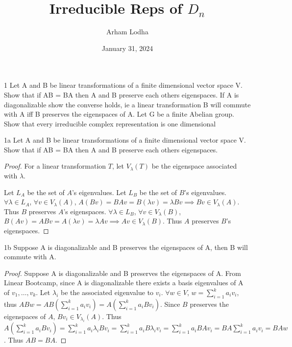 \documentclass{article}
\begin{document}
\title{Irreducible Reps of $D_n$}
\author{Arham Lodha}%
\date{January 31, 2024}%
\maketitle

\begin{PROB}{1}\label{Problem 1.}
    Let A and B be linear transformations of a finite dimensional vector space V. Show that if AB = BA then A and B preserve each others eigenspaces. If A is diagonalizable show the converse holds, ie a linear transformation B will commute with A iff B preserves the eigenspaces of A. Let G be a finite Abelian group. Show that every irreducible complex representation is one dimensional
\end{PROB}
\begin{claim}{1a}\label{Claim 1a.}
    Let A and B be linear transformations of a finite dimensional vector space V. Show that if AB = BA then A and B preserve each others eigenspaces.
\end{claim}
\begin{proof}
    For a linear transformation $T$, let $V_\lambda(T)$ be the eigenspace associated with $\lambda$.   

    Let $L_A$ be the set of $A$'s eigenvalues. Let $L_B$ be the set of $B$'s eigenvalues. $\forall \lambda \in L_A$, $\forall v \in V_\lambda(A)$, $A(Bv) = BAv = B \left(\lambda v\right) = \lambda Bv \implies Bv \in V_\lambda(A)$. Thus $B$ preserves $A$'s eigenspaces. $\forall \lambda \in L_B$, $\forall v \in V_\lambda(B)$, $B(Av) = ABv = A \left(\lambda v\right) = \lambda Av \implies Av \in V_\lambda(B)$. Thus $A$ preserves $B$'s eigenspaces.
\end{proof}
\begin{claim}{1b}\label{Claim 1b.}
    Suppose A is diagonalizable and B preserves the eigenspaces of A, then B will commute with A.
\end{claim}
\begin{proof}
    Suppose A is diagonalizable and B preserves the eigenspaces of A. From Linear Bootcamp, since A is diagonalizable there exists a basis eigenvalues of A of $v_1, \dots, v_k$. Let $\lambda_i$ be the associated eigenvalue to $v_i$. $\forall w \in V$, $w = \sum_{i = 1}^{k}a_iv_i$, thus $ABw = AB(\sum_{i = 1}^{k}a_iv_i) = A(\sum_{i = 1}^{k}a_iBv_i)$. Since $B$ preserves the eigenspaces of $A$, $Bv_i  \in V_{\lambda_i}(A)$. Thus $A(\sum_{i = 1}^{k}a_iBv_i) = \sum_{i = 1}^{k}a_i\lambda_iBv_i = \sum_{i = 1}^{k}a_iB\lambda_iv_i = \sum_{i = 1}^{k}a_iBAv_i = BA\sum_{i = 1}^{k}a_iv_i = BAw$. Thus $AB = BA$.      
\end{proof}
\end{document}
